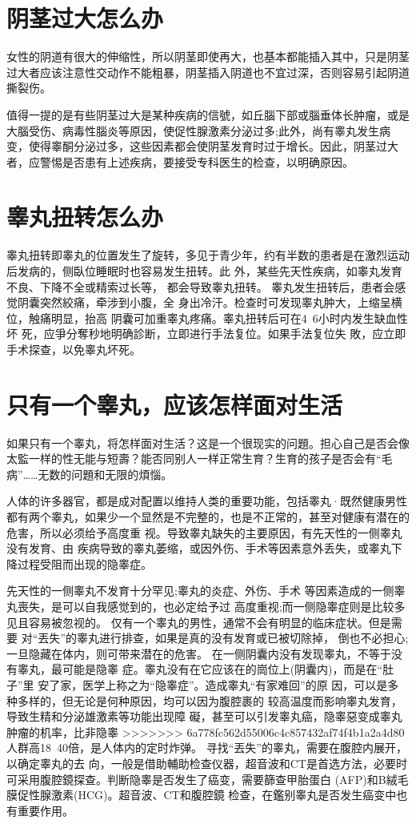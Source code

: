 \documentclass[12pt,UTF8]{ctexbook}
\begin{document}
\section{阴茎过大怎么办}

女性的阴道有很大的伸缩性，所以阴茎即使再大，也基本都能插入其中，只是阴茎过大者应该注意性交动作不能粗暴，阴茎插入阴道也不宜过深，否则容易引起阴道撕裂伤。

值得一提的是有些阴茎过大是某种疾病的信號，如丘腦下部或腦垂体长肿瘤，或是大腦受伤、病毒性腦炎等原因，使促性腺激素分泌过多;此外，尚有睾丸发生病变，使得睾酮分泌过多，这些因素都会使阴茎发育时过于增长。因此，阴茎过大者，应警惕是否患有上述疾病，要接受专科医生的检查，以明确原因。

\section{睾丸扭转怎么办}

睾丸扭转即睾丸的位置发生了旋转，多见于青少年，约有半数的患者是在激烈运动后发病的，侧臥位睡眠时也容易发生扭转。此
外，某些先天性疾病，如睾丸发育不良、下降不全或精索过长等，
都会导致睾丸扭转。
睾丸发生扭转后，患者会感觉阴囊突然絞痛，牵涉到小腹，全
身出冷汗。检查时可发现睾丸肿大，上缩呈横位，触痛明显，抬高
阴囊可加重睾丸疼痛。睾丸扭转后可在4~6小时内发生缺血性坏
死，应爭分奪秒地明确診断，立即进行手法复位。如果手法复位失
敗，应立即手术探查，以免睾丸坏死。

\section{只有一个睾丸，应该怎样面对生活}

如果只有一个睾丸，将怎样面对生活？这是一个很现实的问題。担心自己是否会像太監一样的性无能与短壽？能否同别人一样正常生育？生育的孩子是否会有“毛病”……无数的问題和无限的煩惱。

人体的许多器官，都是成对配置以维持人类的重要功能，包括睾丸·既然健康男性都有两个睾丸，如果少一个显然是不完整的，也是不正常的，甚至对健康有潜在的危害，所以必须给予高度重
视。导致睾丸缺失的主要原因，有先天性的一侧睾丸没有发育、由
疾病导致的睾丸萎缩，或因外伤、手术等因素意外丢失，或睾丸下
降过程受阻而出现的隐睾症。

先天性的一侧睾丸不发育十分罕见;睾丸的炎症、外伤、手术
等因素造成的一侧睾丸喪失，是可以自我感觉到的，也必定给予过
高度重视;而一侧隐睾症则是比较多见且容易被忽视的。
仅有一个睾丸的男性，通常不会有明显的临床症状。但是需要
对“丟失”的睾丸进行排查，如果是真的没有发育或已被切除掉，
倒也不必担心;一旦隐藏在体内，则可带来潜在的危害。
在一侧阴囊内没有发现睾丸，不等于没有睾丸，最可能是隐睾
症。睾丸没有在它应该在的崗位上(阴囊内)，而是在“肚子”里
安了家，医学上称之为“隐睾症”。造成睾丸“有家难回”的原
因，可以是多种多样的，但无论是何种原因，均可以因为腹腔裹的
较高温度而影响睾丸发育，导致生精和分泌雄激素等功能出现障
礙，甚至可以引发睾丸癌，隐睾惡变成睾丸肿瘤的机率，比非隐睾
>>>>>>> 6a778fc562d55006c4c857432af74f4b1a2a4d80
人群高18~40倍，是人体内的定时炸弹。
寻找“丟失”的睾丸，需要在腹腔内展开，以确定睾丸的去
向，一般是借助輔助检查仪器，超音波和CT是首选方法，必要时
可采用腹腔鏡探查。判断隐睾是否发生了癌变，需要篩查甲胎蛋白
(AFP)和B絨毛膜促性腺激素(HCG)。超音波、CT和腹腔鏡
检查，在鑑别睾丸是否发生癌变中也有重要作用。
\end{document}
